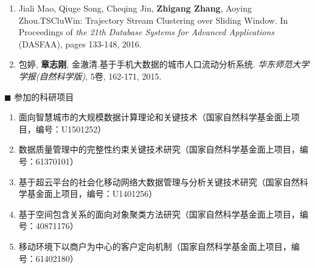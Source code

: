 \begin{enumerate}
	\item  Jiali Mao, Qiuge Song, Cheqing Jin, \textbf{Zhigang Zhang},  Aoying Zhou.TSCluWin: Trajectory Stream Clustering over Sliding Window. In Proceedings of \textit{the 21th Database Systems for Advanced Applications} (DASFAA), pages 133-148, 2016.
	
	\item 包婷, \textbf{章志刚}, 金澈清.基于手机大数据的城市人口流动分析系统.  \textit{华东师范大学学报(自然科学版)}, 5卷, 162-171, 2015.

\end{enumerate}

{\heiti $\blacksquare$ 参加的科研项目}
\begin{enumerate}
	\renewcommand{\labelenumi}{[\theenumi]}
	\renewcommand\baselinestretch{1}\selectfont 	
	
	
	
	\item 面向智慧城市的大规模数据计算理论和关键技术（国家自然科学基金面上项目，编号：U1501252）
	
	\item 数据质量管理中的完整性约束关键技术研究（国家自然科学基金面上项目，编号：61370101）
	
	\item 基于超云平台的社会化移动网络大数据管理与分析关键技术研究（国家自然科学基金面上项目，编号：U1401256）
	
	\item 基于空间包含关系的面向对象聚类方法研究（国家自然科学基金面上项目，编号：40871176）
		
	\item 移动环境下以商户为中心的客户定向机制（国家自然科学基金面上项目，编号：61402180）

\end{enumerate}
